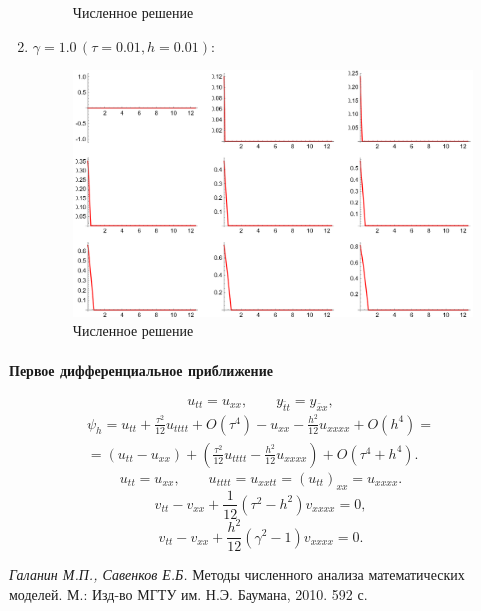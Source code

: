 \documentclass[12pt, a4paper]{article}
\begin{document}
\begin{enumerate}
\begin{figure}[H]
		\caption{Численное решение}
	\end{figure}
\newpage
	\item $\gamma =1.0\,(\tau = 0.01 ,h =0.01)$:
	\begin{figure}[H]
		\centering
		\includegraphics[width=0.7\linewidth]{task3_1.0}
		\caption{Численное решение}
	\end{figure}
\end{enumerate}
\paragraph{Первое дифференциальное приближение}
\[
	u_{tt}=u_{xx},\qquad
	y_{\bar tt}=y_{\bar xx},
	\]
	\begin{multline*}
\psi_h=u_{tt}+\frac{\tau^2}{12}u_{tttt}+O(\tau^4)-u_{xx}-\frac{h^2}{12}u_{xxxx}+O(h^4)=\\=(u_{tt}-u_{xx})+(\frac{\tau^2}{12}u_{tttt}-\frac{h^2}{12}u_{xxxx})+O(\tau^4+h^4).
	\end{multline*} 
\[
u_{tt}=u_{xx},\qquad u_{tttt}=u_{xxtt}=(u_{tt})	_{xx}=u_{xxxx}.
\]
\[
v_{tt}-v_{xx}+\frac{1}{12}(\tau^2-h^2)v_{xxxx}=0,
\]
\[
v_{tt}-v_{xx}+\frac{h^2}{12}(\gamma^2-1)v_{xxxx}=0.
\]
	
	\newpage
	\begin{thebibliography}{1}
		 \textit{Галанин М.П., Савенков Е.Б.} Методы численного анализа математических\\ моделей. М.: Изд-во МГТУ им. Н.Э. Баумана,	2010. 592 с.
		
		
	\end{thebibliography}
	
	
\end{document}
